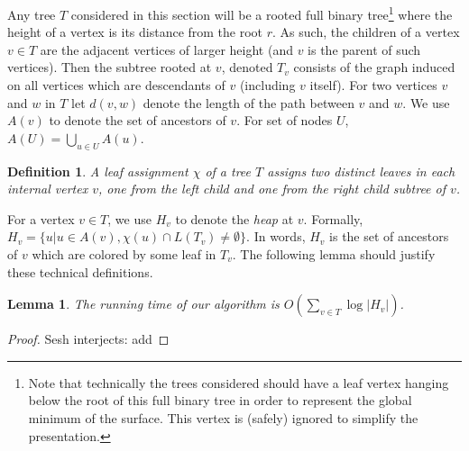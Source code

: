 \documentclass[11pt]{article}
\newtheorem{lemma}[theorem]{Lemma}
\newtheorem{definition}[theorem]{Definition}
\theoremstyle{definition}
\newcommand{\Reminder}[1]{{\color{red}#1}}
\newcommand{\Sesh}[1]{\Reminder{Sesh interjects: #1}}
\begin{document}
Any tree $T$ considered in this section will be a rooted full binary tree\footnote{Note 
that technically the trees considered should have a leaf vertex hanging below the root of this 
full binary tree in order to represent the global minimum of the surface.  This vertex is 
(safely) ignored to simplify the presentation.} where the height of a vertex is its distance 
from the root $r$.  As such, the children of a vertex $v\in T$ are the adjacent vertices of larger height
(and $v$ is the parent of such vertices).  Then the subtree rooted at $v$, denoted $T_v$ consists of the graph induced on all 
vertices which are descendants of $v$ (including $v$ itself).  For two vertices $v$ and $w$ in $T$ let $d(v,w)$ denote the 
length of the path between $v$ and $w$.
We use $A(v)$ to denote the set of ancestors of $v$.
For set of nodes $U$, $A(U) = \bigcup_{u \in U} A(u)$.


\begin{definition}
 A \emph{leaf assignment} $\chi$ of a tree $T$ assigns \emph{two} distinct leaves in each internal vertex $v$,
 one from the left child and one from the right child subtree of $v$.
\end{definition}

For a vertex $v\in T$, we use $H_v$ to denote the \emph{heap} at $v$.
Formally, $H_v = \{u | u \in A(v), \chi(u) \cap L(T_v) \neq \emptyset\}$.
In words, $H_v$ is the set of ancestors of $v$ which are colored by some leaf in $T_v$.
The following lemma should justify these technical definitions.

\begin{lemma}
The running time of our algorithm is $O(\sum_{v \in T} \log |H_v|)$.
\end{lemma}

\begin{proof} \Sesh{add}

\end{proof}

%
%
\end{document}
